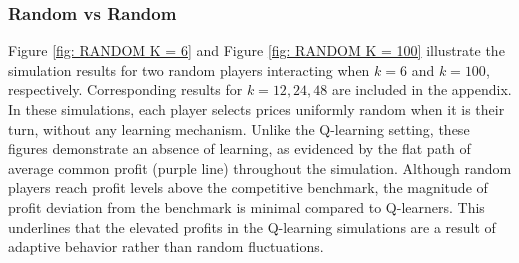 \documentclass{article}
\begin{document}
\subsubsection{Random vs Random}
\label{RvsR}
Figure \ref{fig: RANDOM K = 6} and Figure \ref{fig: RANDOM K = 100} illustrate the simulation results for two random players interacting when $ k = 6 $ and $ k = 100 $, respectively. Corresponding results for $ k = 12, 24, 48 $ are included in the appendix. In these simulations, each player selects prices uniformly random when it is their turn, without any learning mechanism.
\newline
Unlike the Q-learning setting, these figures demonstrate an absence of learning, as evidenced by the flat path of average common profit (purple line) throughout the simulation. 
\newline
Although random players reach profit levels above the competitive benchmark, the magnitude of profit deviation from the benchmark is minimal compared to Q-learners. This underlines that the elevated profits in the Q-learning simulations are a result of adaptive behavior rather than random fluctuations.
\end{document}
